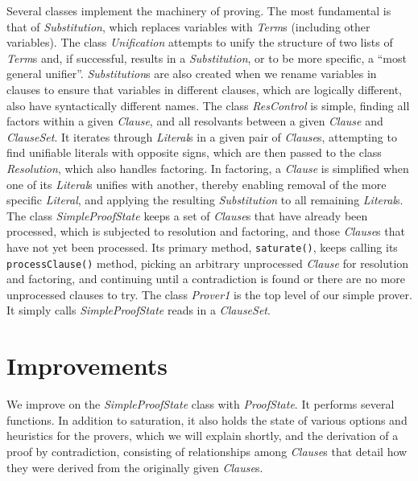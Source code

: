 \documentclass{llncs}
\begin{document}
Several classes implement the machinery of proving.  The most
fundamental is that of \emph{Substitution}, which replaces variables
with \emph{Term}s (including other variables).  The class
\emph{Unification} attempts to unify the structure of two lists of
\emph{Term}s and, if successful, results in a \emph{Substitution}, or to be
more specific, a ``most general unifier''.  \emph{Substitution}s
are also created when we rename variables in clauses to ensure that
variables in different clauses, which are logically different, also
have syntactically different names.
The class \emph{ResControl} is simple, finding all factors within a
given \emph{Clause}, and all resolvants between a given \emph{Clause}
and \emph{ClauseSet}. It
iterates through \emph{Literal}s in a given pair of \emph{Clause}s,
attempting to find unifiable literals with opposite signs, which are
then passed to the class \emph{Resolution}, which also handles factoring.
In factoring, a \emph{Clause} is
simplified when one of its \emph{Literal}s unifies with another,
thereby enabling removal of the more specific \emph{Literal}, and applying
the resulting \emph{Substitution} to all remaining \emph{Literal}s.
  The class \emph{SimpleProofState} keeps a set
of \emph{Clause}s that have already been processed, which is subjected
to resolution and factoring, and those \emph{Clause}s that have not
yet been processed.  Its primary method, \texttt{saturate()}, keeps
calling its \texttt{processClause()} method, picking an arbitrary
unprocessed \emph{Clause} for resolution and factoring, and continuing
until a contradiction is found or there are no more unprocessed
clauses to try.  The class \emph{Prover1} is the top level of our
simple prover.  It simply calls \emph{SimpleProofState} reads in a
\emph{ClauseSet}.

\section{Improvements}

We improve on the \emph{SimpleProofState} class with \emph{ProofState}. It performs
several functions.  In addition to saturation, it also holds the state
of various options and heuristics for the provers, which we will
explain shortly, and the derivation of a proof by contradiction,
consisting of relationships among \emph{Clause}s that detail how they were
derived from the originally given \emph{Clause}s.
\end{document}
